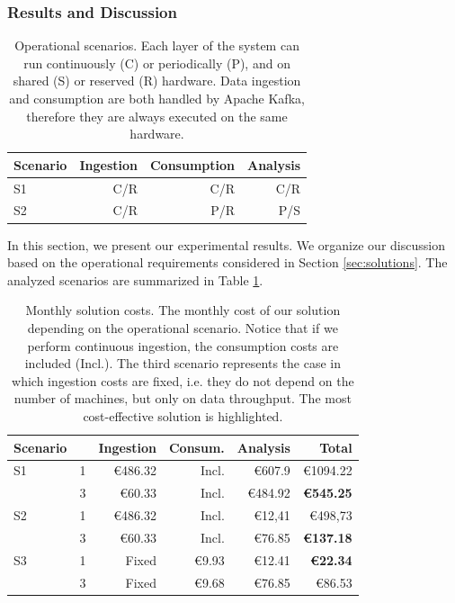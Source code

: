 {\subsubsection{Results and Discussion}
\label{sec:results}

\begin{table}[ht]
\centering
\caption{Operational scenarios. Each layer of the system can run continuously (C) or periodically (P), and on shared (S) or reserved (R) hardware. Data ingestion and consumption are both handled by Apache Kafka, therefore they are always executed on the same hardware.}
\begin{tabular}{@{}lrrr@{}} \toprule
Scenario & Ingestion & Consumption & Analysis \\
\midrule
S1 & C/R & C/R & C/R \\
S2 & C/R & P/R & P/S \\
\bottomrule
\end{tabular}
\label{tab:scenarios}
\end{table}

In this section, we present our experimental results. We organize our discussion based on the operational requirements considered in Section \ref{sec:solutions}. The analyzed scenarios are summarized in Table \ref{tab:scenarios}. 

\begin{table}[ht]
\centering
\caption{Monthly solution costs. The monthly cost of our solution depending on the operational scenario. Notice that if we perform continuous ingestion, the consumption costs are included (Incl.). The third scenario represents the case in which ingestion costs are fixed, i.e. they do not depend on the number of machines, but only on data throughput. The most cost-effective solution is highlighted.}
\begin{tabular}{@{}llrrrr@{}} \toprule
Scenario & & Ingestion & Consum. & Analysis & Total\\
\midrule
S1 & \sparkdi{}1 & \euro486.32 & Incl. & \euro607.9 & \euro1094.22 \\
   & \sti{}3 & \euro60.33 & Incl. & \euro484.92 & \textbf{\euro545.25}\\
\midrule
S2 & \sparkdi{}1 & \euro486.32 & Incl. & \euro12,41 & \euro498,73\\
   & \sti{}3 & \euro60.33 & Incl. & \euro76.85 & \textbf{\euro137.18}\\
\midrule
S3 & \sparkdi{}1 & Fixed & \euro9.93 & \euro12.41 & \textbf{\euro22.34}\\
   & \sti{}3 & Fixed & \euro9.68 & \euro76.85 & \euro86.53\\
\bottomrule
\end{tabular}
\label{tab:monthly}
\end{table}

}
